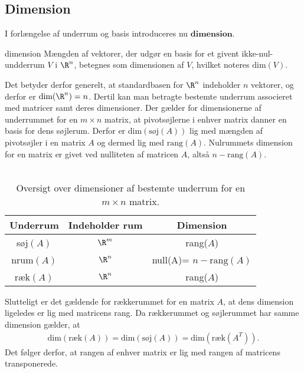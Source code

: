 \subsection{Dimension}
I forlængelse af underrum og basis introduceres nu
$\mathbf{dimension}$. 
%
\begin{defn}{}{dimension}
Mængden af vektorer, der udgør en basis for et givent ikke-nul-undderrum $V$ i $\R^n$, betegnes som dimensionen af $V$, hvilket noteres $\text{dim}(V)$. 
\end{defn}
\noindent
Det betyder derfor generelt, at standardbasen for $\R^n$ indeholder $n$ vektorer, og derfor er $\text{dim}(\R^n) = n$. 
Dertil kan man betragte bestemte underrum associeret med matricer samt deres dimensioner. 
Der gælder for dimensionerne af underrummet for en $m \times n$ matrix, at pivotsøjlerne i enhver matrix danner en basis for dens søjlerum. 
Derfor er $\text{dim}(\text{søj}(A))$ lig med mængden af pivotsøjler i en matrix $A$ og dermed lig med $\text{rang}(A)$. 
Nulrummets dimension for en matrix er givet ved nulliteten af matricen $A$, altså $n-\text{rang}(A)$. 
\\\\
%
\begin{table}[h!]
\begin{center}
 \begin{tabular}{||c c c||} 
 \hline
 Underrum & Indeholder rum & Dimension\\
 \hline\hline
 søj$(A)$ & $\R^m$ & rang($A$)\\ 
 \hline
 nrum$(A)$ & $\R^n$ & null(A)= $n-\text{rang}(A)$\\
 \hline
 ræk$(A)$ & $\R^n$ & rang($A$)\\
 \hline
\end{tabular}
\caption{Oversigt over dimensioner af bestemte underrum for en $m \times n$ matrix.}
\end{center}
\end{table}
%


%
\noindent
Slutteligt er det gældende for rækkerummet for en matrix $A$, at dens dimension ligeledes er lig med matricens rang. 
Da rækkerummet og søjlerummet har samme dimension gælder, at
%
\begin{align*}
\text{dim}(\text{ræk}(A))=\text{dim}(\text{søj}(A))=\text{dim}(\text{ræk}(A^T)).
\end{align*}
%
Det følger derfor, at rangen af enhver matrix er lig med rangen af matricens transponerede. 
%